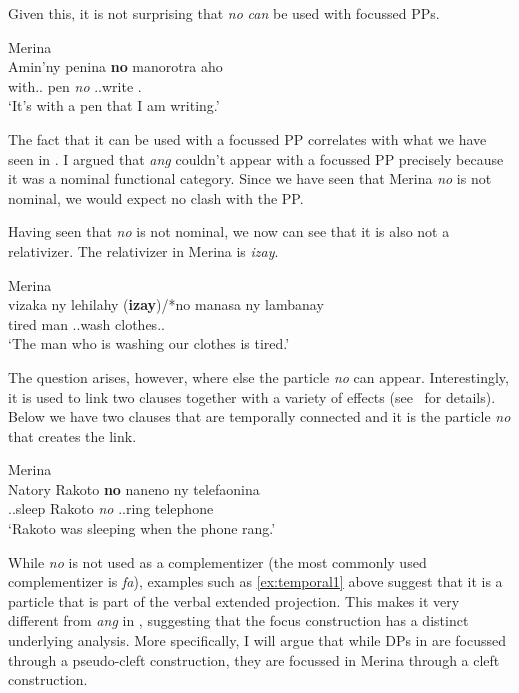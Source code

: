 \documentclass[output=paper]{langsci/langscibook}
\begin{document}
Given this, it is not surprising that \emph{no} \emph{can} be used with
focussed PPs.

\ea Merina\\
	\gll Amin'ny penina \textbf{no} manorotra aho\\
    with.\Gen{}.\Det{} pen \emph{no} \Prs.\At{}.write \Fsg{}.\Nom{}\\
    \glt `It's with a pen that I am writing.'
\z

The fact that it can be used with a focussed PP correlates with what we have
seen in .  I argued that \emph{ang} couldn't appear with a focussed PP
precisely because it was a nominal functional category.  Since we have seen
that Merina \emph{no} is not nominal, we would expect no clash with the PP.

Having seen that \emph{no} is not nominal, we now can see that it is also not a
relativizer.  The relativizer in Merina is \emph{izay}.

\ea Merina\\
	\gll  vizaka ny lehilahy (\textbf{izay})/*no manasa ny lambanay\\
    tired  \Det{} man \hphantom{(}\Rel{} \Prs.\At{}.wash \Det{} clothes.\Fpl.\Excl{}\\
    \glt `The man who is washing our clothes is tired.'
\z

The question arises, however, where else the particle \emph{no} can appear.
Interestingly, it is used to link two clauses together with a variety of
effects (see~\citealt{Pearson:2009a} for details).  Below we have two clauses
that are temporally connected and it is the particle \emph{no} that creates the
link.\newpage

\ea Merina\\
	\gll Natory Rakoto \textbf{no} naneno ny telefaonina\label{ex:temporal1} \\
    \Pst.\At{}.sleep Rakoto \emph{no} \Pst.\At{}.ring \Det{} telephone\\
    \glt `Rakoto was sleeping when the phone rang.'
\z

While \emph{no} is not used as a complementizer (the most commonly used
complementizer is \emph{fa}), examples such as \eqref{ex:temporal1} above
suggest that it is a particle that is part of the verbal extended projection.
This makes it very different from \emph{ang} in , suggesting that
the focus construction has a distinct underlying analysis.  More specifically,
I will argue that while  DPs in  are focussed through a
pseudo-cleft construction, they are focussed in Merina through a cleft
construction.
\end{document}
